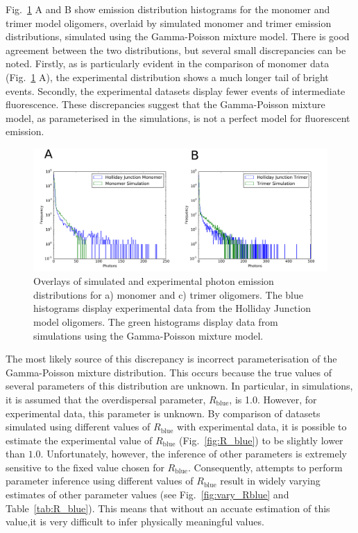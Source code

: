 Fig.~\ref{fig:HJ_sim_overlay} A and B show emission distribution histograms for the monomer and trimer model oligomers, overlaid by simulated monomer and trimer emission distributions, simulated using the Gamma-Poisson mixture model. There is good agreement between the two distributions, but several small discrepancies can be noted. Firstly, as is particularly evident in the comparison of monomer data (Fig.~\ref{fig:HJ_sim_overlay} A), the experimental distribution shows a much longer tail of bright events. Secondly, the experimental datasets display fewer events of intermediate fluorescence. These discrepancies suggest that the Gamma-Poisson mixture model, as parameterised in the simulations, is not a perfect model for fluorescent emission.

\begin{figure}
   \begin{center}
      \includegraphics*[clip=true, width=6.5in]{sizing/HJ_overlays.pdf}
      \caption{Overlays of simulated and experimental photon emission distributions for a) monomer and c) trimer oligomers. The blue histograms display experimental data from the Holliday Junction model oligomers. The green histograms display data from simulations using the Gamma-Poisson mixture model.}
      \label{fig:HJ_sim_overlay}
   \end{center}
\end{figure}

The most likely source of this discrepancy is incorrect parameterisation of the Gamma-Poisson mixture distribution. This occurs because the true values of several parameters of this distribution are unknown. In particular, in simulations, it is assumed that the overdispersal parameter, $R_{\text{blue}}$, is 1.0. However, for experimental data, this parameter is unknown. By comparison of datasets simulated using different values of $R_{\text{blue}}$ with experimental data, it is possible to estimate the experimental value of $R_{\text{blue}}$ (Fig.~\ref{fig:R_blue}) to be slightly lower than $1.0$. Unfortunately, however, the inference of other parameters is extremely sensitive to the fixed value chosen for $R_{\text{blue}}$. Consequently, attempts to perform parameter inference using different values of $R_{\text{blue}}$ result in widely varying estimates of other parameter values (see Fig.~\ref{fig:vary_Rblue} and Table~\ref{tab:R_blue}). This means that without an accuate estimation of this value,it is very difficult to infer physically meaningful values.

